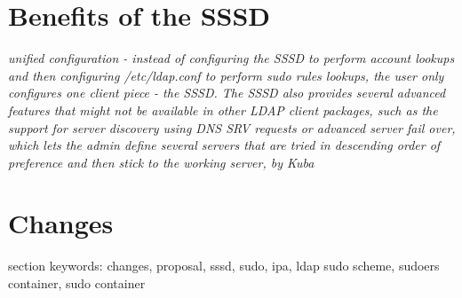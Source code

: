 \documentclass[12pt,a4paper,titlepage,final]{article}
\begin{document}
\section{Benefits of the SSSD}
\textit{unified configuration - instead of configuring the SSSD to perform account
lookups and then configuring /etc/ldap.conf to perform sudo rules lookups, the
user only configures one client piece - the SSSD. The SSSD also provides several
advanced features that might not be available in other LDAP client packages,
such as the support for server discovery using DNS SRV requests or advanced
server fail over, which lets the admin define several servers that are tried in
descending order of preference and then stick to the working server, by Kuba}

\section{Changes}
{\Large{section keywords:}} changes, proposal, sssd, sudo, ipa, ldap sudo scheme,
sudoers container, sudo container
\end{document}
